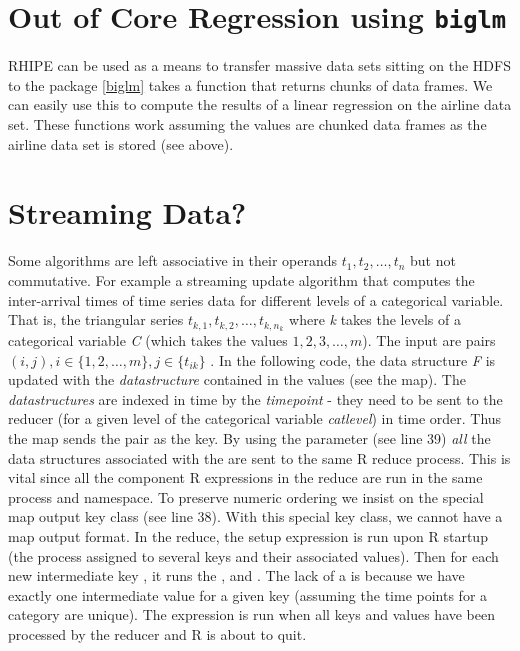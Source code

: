 \documentclass[letterpaper,10pt,english]{sphinxmanual}
\begin{document}

\section{Out of Core Regression using \texttt{biglm}}
\label{airline:index-12}\label{airline:out-of-core-regression-using-biglm}\label{airline:out-of-core-regression}
RHIPE can be used as a means to transfer massive data sets sitting on the HDFS to the package {\hyperref[airline:biglm]{{[}biglm{]}}}
 takes a function that returns chunks of data frames. We can easily use this to compute the results of a linear
regression on the airline data set. These functions work assuming the values are chunked data frames
as the airline data set is stored (see above).


\section{Streaming Data?}
\label{airline:id7}\label{airline:streaming-data}
Some algorithms are left associative in their operands
$t_1,t_2,\ldots,t_n$ but not commutative. For example a streaming update
algorithm that computes the inter-arrival times of time series data for
different levels of a categorical variable. That is, the triangular series
$t_{k,1},t_{k,2},\ldots,t_{k,n_k}$ where \emph{k} takes the levels of a
categorical variable \emph{C} (which takes the values $1,2,3,\ldots,m$). The
input are pairs $(i,j), i \in \{1,2,\ldots,m\}, j \in \{t_{ik}\}$
. In the following code, the data structure \emph{F} is updated with the
\emph{datastructure} contained in the values (see the map). The \emph{datastructures}
are indexed in time by the \emph{timepoint} - they need to be sent to the reducer
(for a given level of the categorical variable \emph{catlevel}) in time order. Thus
the map sends the pair  as the key. By using the
 parameter (see line 39) \emph{all} the data structures associated with the 
are sent to the same R reduce process. This is vital since all the component
R expressions in the reduce are run in the same process and namespace. To
preserve numeric ordering we insist on the special map output key class (see
line 38). With this special key class, we cannot have a map output format.
In the reduce, the setup expression  is run upon R startup (the
process assigned to several keys and their associated values). Then for each new
intermediate key , it runs the ,  and
. The lack of a  is because we have exactly one intermediate
value for a given key (assuming the time points for a category are unique).
The  expression is run when all keys and values have been processed
by the reducer and R is about to quit.
\end{document}

